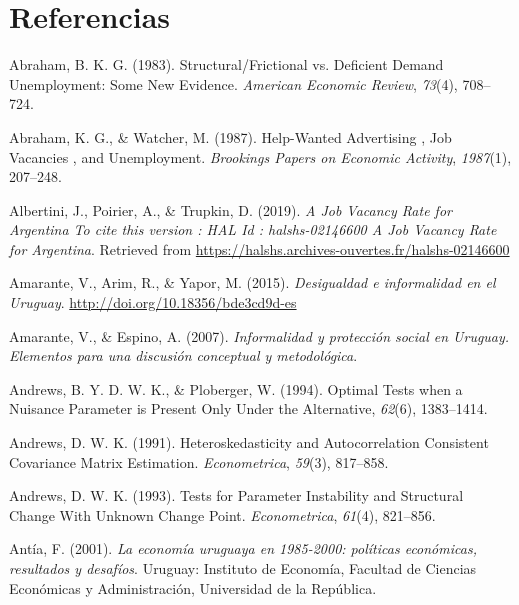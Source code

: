 \documentclass[12pt,oneside]{reedthesis}
\begin{document}

\noindent
\setlength{\parindent}{-0.20in}
\setlength{\leftskip}{0.20in}
\setlength{\parskip}{8pt}

\hypertarget{referencias}{%
\chapter*{Referencias}\label{referencias}}

\hypertarget{refs}{}
\leavevmode\hypertarget{ref-Abraham1983}{}%
Abraham, B. K. G. (1983). Structural/Frictional vs. Deficient Demand Unemployment: Some New Evidence. \emph{American Economic Review}, \emph{73}(4), 708--724.

\leavevmode\hypertarget{ref-Abraham1987}{}%
Abraham, K. G., \& Watcher, M. (1987). Help-Wanted Advertising , Job Vacancies , and Unemployment. \emph{Brookings Papers on Economic Activity}, \emph{1987}(1), 207--248.

\leavevmode\hypertarget{ref-ArgentinaBC2019}{}%
Albertini, J., Poirier, A., \& Trupkin, D. (2019). \emph{A Job Vacancy Rate for Argentina To cite this version : HAL Id : halshs-02146600 A Job Vacancy Rate for Argentina}. Retrieved from \url{https://halshs.archives-ouvertes.fr/halshs-02146600}

\leavevmode\hypertarget{ref-Amarante2015}{}%
Amarante, V., Arim, R., \& Yapor, M. (2015). \emph{Desigualdad e informalidad en el Uruguay}. \url{http://doi.org/10.18356/bde3cd9d-es}

\leavevmode\hypertarget{ref-Amarante2007}{}%
Amarante, V., \& Espino, A. (2007). \emph{Informalidad y protección social en Uruguay. Elementos para una discusión conceptual y metodológica}.

\leavevmode\hypertarget{ref-Andrews1994}{}%
Andrews, B. Y. D. W. K., \& Ploberger, W. (1994). Optimal Tests when a Nuisance Parameter is Present Only Under the Alternative, \emph{62}(6), 1383--1414.

\leavevmode\hypertarget{ref-Andrews1991}{}%
Andrews, D. W. K. (1991). Heteroskedasticity and Autocorrelation Consistent Covariance Matrix Estimation. \emph{Econometrica}, \emph{59}(3), 817--858.

\leavevmode\hypertarget{ref-Andrews1993}{}%
Andrews, D. W. K. (1993). Tests for Parameter Instability and Structural Change With Unknown Change Point. \emph{Econometrica}, \emph{61}(4), 821--856.

\leavevmode\hypertarget{ref-Antia2001}{}%
Antía, F. (2001). \emph{La economía uruguaya en 1985-2000: políticas económicas, resultados y desafíos}. Uruguay: Instituto de Economía, Facultad de Ciencias Económicas y Administración, Universidad de la República.
\end{document}
